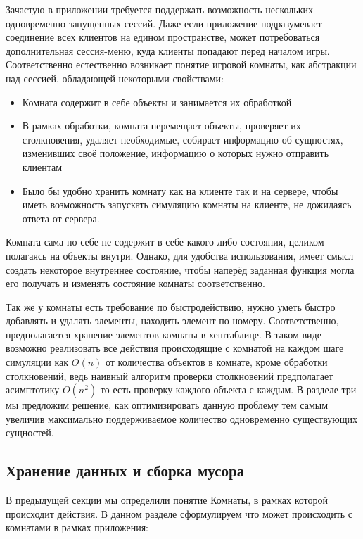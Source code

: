 \documentclass[a4paper,14pt, openany]{book}
\begin{document}
Зачастую в приложении требуется поддержать возможность нескольких одновременно запущенных сессий. Даже если приложение подразумевает соединение всех клиентов на едином пространстве, может потребоваться дополнительная сессия-меню, куда клиенты попадают перед началом игры. Соответственно естественно возникает понятие игровой комнаты, как абстракции над сессией, обладающей некоторыми свойствами:

\begin{itemize}
  \item Комната содержит в себе объекты и занимается их обработкой
  \item В рамках обработки, комната перемещает объекты, проверяет их столкновения, удаляет необходимые, собирает информацию об сущностях, изменивших своё положение, информацию о которых нужно отправить клиентам
  \item Было бы удобно хранить комнату как на клиенте так и на сервере, чтобы иметь возможность запускать симуляцию комнаты на клиенте, не дожидаясь ответа от сервера. 
\end{itemize}

Комната сама по себе не содержит в себе какого-либо состояния, целиком полагаясь на объекты внутри. Однако, для удобства использования, имеет смысл создать некоторое внутреннее состояние, чтобы наперёд заданная функция могла его получать и изменять состояние комнаты соответственно.

Так же у комнаты есть требование по быстродействию, нужно уметь быстро добавлять и удалять элементы, находить элемент по номеру. Соответственно, предполагается хранение элементов комнаты в хештаблице. В таком виде возможно реализовать все действия происходящие с комнатой на каждом шаге симуляции как $O(n) $ от количества объектов в комнате, кроме обработки столкновений, ведь наивный алгоритм проверки столкновений предполагает асимптотику $ O(n^2)$ то есть проверку каждого объекта с каждым. В разделе три мы предложим решение, как оптимизировать данную проблему тем самым увеличив максимально поддерживаемое количество одновременно существующих сущностей.

\subsection{Хранение данных и сборка мусора}

В предыдущей секции мы определили понятие Комнаты, в рамках которой происходит действия. В данном разделе сформулируем что может происходить с комнатами в рамках приложения:
\end{document}
